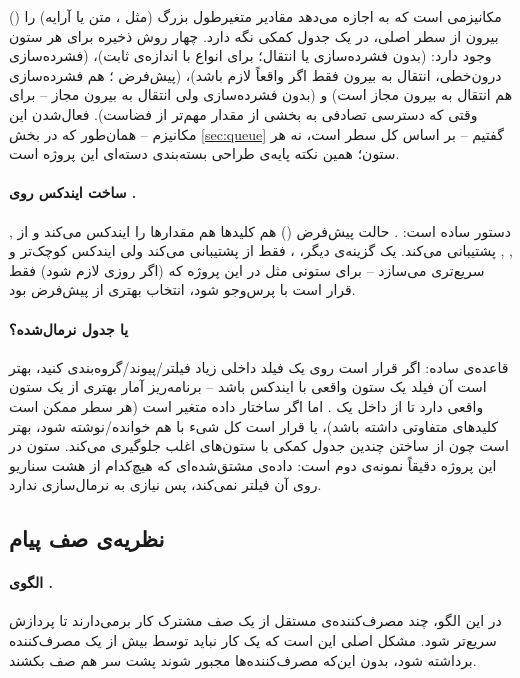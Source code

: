  () \cite{pgtoast} مکانیزمی است که به  اجازه می‌دهد مقادیر متغیرطول بزرگ (مثل ، متن یا آرایه) را بیرون از سطر اصلی، در یک جدول کمکی نگه دارد. چهار روش ذخیره برای هر ستون وجود دارد:  (بدون فشرده‌سازی یا انتقال؛ برای انواع با اندازه‌ی ثابت)،  (فشرده‌سازی درون‌خطی، انتقال به بیرون فقط اگر واقعاً لازم باشد)،  (پیش‌فرض ؛ هم فشرده‌سازی هم انتقال به بیرون مجاز است) و  (بدون فشرده‌سازی ولی انتقال به بیرون مجاز -- برای وقتی که دسترسی تصادفی به بخشی از مقدار مهم‌تر از فضاست). فعال‌شدن این مکانیزم -- همان‌طور که در بخش \ref{sec:queue} گفتیم -- بر اساس کل سطر است، نه هر ستون؛ همین نکته پایه‌ی طراحی بسته‌بندی دسته‌ای این پروژه است.

\paragraph{ساخت ایندکس  روی .} دستور ساده است: . حالت پیش‌فرض () هم کلیدها هم مقدارها را ایندکس می‌کند و از , , ,  پشتیبانی می‌کند. یک گزینه‌ی دیگر، ، فقط از  پشتیبانی می‌کند ولی ایندکس کوچک‌تر و سریع‌تری می‌سازد -- برای ستونی مثل  در این پروژه که (اگر روزی لازم شود) فقط قرار است با  پرس‌وجو شود،  انتخاب بهتری از پیش‌فرض بود.

\paragraph{ یا جدول نرمال‌شده؟} قاعده‌ی ساده: اگر قرار است روی یک فیلد داخلی زیاد فیلتر/پیوند/گروه‌بندی کنید، بهتر است آن فیلد یک ستون واقعی با ایندکس  باشد -- برنامه‌ریز آمار بهتری از یک ستون واقعی دارد تا از داخل یک . اما اگر ساختار داده متغیر است (هر سطر ممکن است کلیدهای متفاوتی داشته باشد)، یا قرار است کل شیء با هم خوانده/نوشته شود،  بهتر است چون از ساختن چندین جدول کمکی با ستون‌های اغلب  جلوگیری می‌کند. ستون  در این پروژه دقیقاً نمونه‌ی دوم است: داده‌ی مشتق‌شده‌ای که هیچ‌کدام از هشت سناریو روی آن فیلتر نمی‌کند، پس نیازی به نرمال‌سازی ندارد.

\subsection{نظریه‌ی صف پیام}

\paragraph{الگوی .} در این الگو، چند مصرف‌کننده‌ی مستقل از یک صف مشترک کار برمی‌دارند تا پردازش سریع‌تر شود. مشکل اصلی این است که یک کار نباید توسط بیش از یک مصرف‌کننده برداشته شود، بدون این‌که مصرف‌کننده‌ها مجبور شوند پشت سر هم صف بکشند.


